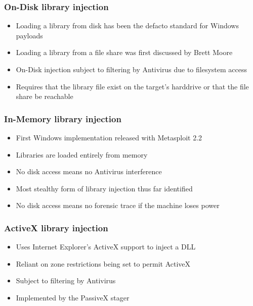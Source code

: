 \documentclass{beamer}
\newenvironment{sitemize}{\vspace{1mm}\begin{itemize}\itemsep 4pt\small}{\end{itemize}}
\begin{document}
\begin{frame}[t]
    \frametitle{On-Disk library injection}

    \begin{sitemize}
        \item Loading a library from disk has been the defacto
        standard for Windows payloads
        \item Loading a library from a file share was first
        discussed by Brett Moore
    \end{sitemize}

    \pause
    \begin{sitemize}
        \item On-Disk injection subject to filtering by Antivirus due to
            filesystem access
        \item Requires that the library file exist on the target's
            harddrive or that the file share be reachable
    \end{sitemize}
\end{frame}

\begin{frame}[t]
    \frametitle{In-Memory library injection}

    \begin{sitemize}
        \item First Windows implementation released with Metasploit 2.2

        \pause
        \item Libraries are loaded entirely from memory

        \pause
        \item No disk access means no Antivirus interference

        \pause
        \item Most stealthy form of library injection thus far
        identified

        \pause
        \item No disk access means no forensic trace if the machine
        loses power
    \end{sitemize}
\end{frame}

\begin{frame}[t]
    \frametitle{ActiveX library injection}

    \begin{sitemize}
        \item Uses Internet Explorer's ActiveX support to inject a DLL
        \item Reliant on zone restrictions being set to permit ActiveX

        \pause
        \item Subject to filtering by Antivirus

        \pause
        \item Implemented by the PassiveX stager
    \end{sitemize}
\end{frame}
\end{document}
